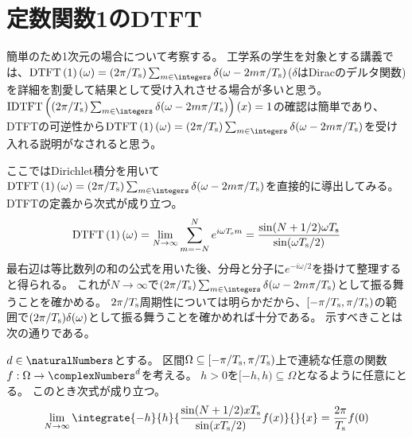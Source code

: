     \section{定数関数1のDTFT}
        \label{定数関数1のDTFT}
        簡単のため1次元の場合について考察する。
        工学系の学生を対象とする講義では、$\DTFTwithArg{1}{\omega} = (2\pi/\Tsamp)\sum_{m\in\integers}\delta(\omega-2m\pi/\Tsamp)$($\delta$はDiracのデルタ関数)を詳細を割愛して結果として受け入れさせる場合が多いと思う。
        $\IDTFTwithArg{(2\pi/\Tsamp)\sum_{m\in\integers}\delta(\omega-2m\pi/\Tsamp)}{x}=1$の確認は簡単であり、DTFTの可逆性から$\DTFTwithArg{1}{\omega} = (2\pi/\Tsamp)\sum_{m\in\integers}\delta(\omega-2m\pi/\Tsamp)$を受け入れる説明がなされると思う。
        \par
        ここではDirichlet積分を用いて$\DTFTwithArg{1}{\omega} = (2\pi/\Tsamp)\sum_{m\in\integers}\delta(\omega-2m\pi/\Tsamp)$を直接的に導出してみる。
        DTFTの定義から次式が成り立つ。
        \[
            \mathrm{DTFT}\left(1\right)\left(\omega\right) = \lim_{N\to\infty} \sum_{m=-N}^N e^{i\omega T_\text{s} m} = \frac{\sin(N+1/2)\omega T_\text{s}}{\sin(\omega T_\text{s}/2)}
        \]
        最右辺は等比数列の和の公式を用いた後、分母と分子に$e^{-i\omega/2}$を掛けて整理すると得られる。
        これが$N\to\infty$で$(2\pi/\Tsamp)\sum_{m\in\integers}\delta(\omega-2m\pi/\Tsamp)$として振る舞うことを確かめる。
        $2\pi/T_\text{s}$周期性については明らかだから、$[-\pi/T_\text{s},\pi/T_\text{s})$の範囲で$(2\pi/T_\text{s})\delta(\omega)$として振る舞うことを確かめれば十分である。
        示すべきことは次の通りである。
        \begin{shadebox}
            $d\in\naturalNumbers$とする。
            区間$\Omega \subseteq [-\pi/T_\text{s},\pi/T_\text{s})$上で連続な任意の関数$f:\Omega\to\complexNumbers^d$を考える。
            $h>0$を$[-h,h) \subseteq \Omega$となるように任意にとる。
            このとき次式が成り立つ。
            \[
                \lim_{N\to\infty} \integrate{-h}{h}{\frac{\sin(N+1/2)x \Tsamp}{\sin(x \Tsamp/2)} f(x)}{}{x} = \frac{2\pi}{\Tsamp} f(0)
            \]
        \end{shadebox}
